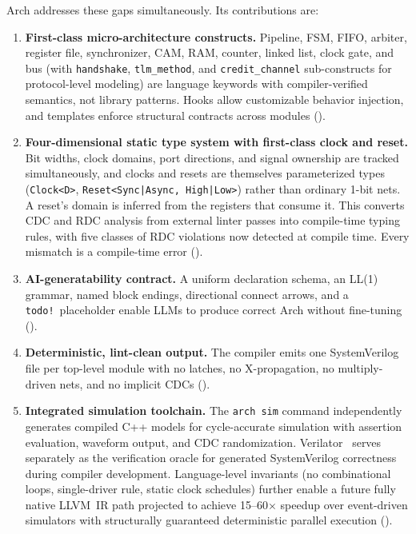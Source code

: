 \documentclass[11pt,twocolumn]{article}
\begin{document}
Arch addresses these gaps simultaneously. Its contributions are:

\begin{enumerate}
\item \textbf{First-class micro-architecture constructs.} Pipeline, FSM, FIFO, arbiter, register file, synchronizer, CAM, RAM, counter, linked list, clock gate, and bus (with \texttt{handshake}, \texttt{tlm\_method}, and \texttt{credit\_channel} sub-constructs for protocol-level modeling) are language keywords with compiler-verified semantics, not library patterns. Hooks allow customizable behavior injection, and templates enforce structural contracts across modules ().

\item \textbf{Four-dimensional static type system with first-class clock and reset.} Bit widths, clock domains, port directions, and signal ownership are tracked simultaneously, and clocks and resets are themselves parameterized types (\texttt{Clock<D>}, \texttt{Reset<Sync|Async, High|Low>}) rather than ordinary 1-bit nets. A reset's domain is inferred from the registers that consume it. This converts CDC and RDC analysis from external linter passes into compile-time typing rules, with five classes of RDC violations now detected at compile time. Every mismatch is a compile-time error ().

\item \textbf{AI-generatability contract.} A uniform declaration schema, an LL(1) grammar, named block endings, directional connect arrows, and a \texttt{todo!}\ placeholder enable LLMs to produce correct Arch without fine-tuning ().

\item \textbf{Deterministic, lint-clean output.} The compiler emits one SystemVerilog file per top-level module with no latches, no X-propagation, no multiply-driven nets, and no implicit CDCs ().

\item \textbf{Integrated simulation toolchain.} The \texttt{arch sim} command independently generates compiled C++ models for cycle-accurate simulation with assertion evaluation, waveform output, and CDC randomization. Verilator~\cite{verilator} serves separately as the verification oracle for generated SystemVerilog correctness during compiler development. Language-level invariants (no combinational loops, single-driver rule, static clock schedules) further enable a future fully native LLVM~IR path projected to achieve 15--60$\times$ speedup over event-driven simulators with structurally guaranteed deterministic parallel execution ().
\end{enumerate}
\end{document}
